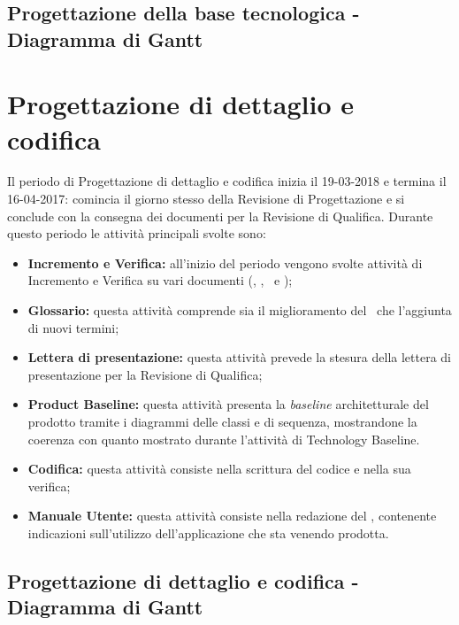 \documentclass[PianoDiProgetto.tex]{subfiles}
\begin{document}
\begin{landscape}
	\subsection{Progettazione della base tecnologica - Diagramma di Gantt}
\end{landscape}

\section{Progettazione di dettaglio e codifica}
Il periodo di Progettazione di dettaglio e codifica inizia il 19-03-2018 e termina il 16-04-2017: comincia il giorno stesso della Revisione di Progettazione e si conclude con la consegna dei documenti per la Revisione di Qualifica. Durante questo periodo le attività principali svolte sono:
\begin{itemize}
	\item \textbf{Incremento e Verifica:} all'inizio del periodo vengono svolte attività di Incremento e Verifica su vari documenti (\ndp, \pdp, \pdq\ e \tb);
	\item \textbf{Glossario:} questa attività comprende sia il miglioramento del \g\ che l'aggiunta di nuovi termini;
	\item \textbf{Lettera di presentazione:} questa attività prevede la stesura della lettera di presentazione per la Revisione di Qualifica;
	\item \textbf{Product Baseline:} questa attività presenta la \textit{baseline} architetturale del prodotto tramite i  diagrammi delle classi e di sequenza, mostrandone la coerenza con quanto mostrato durante l'attività di Technology Baseline. 
	\item \textbf{Codifica:} questa attività consiste nella scrittura del codice e nella sua verifica;
	\item \textbf{Manuale Utente:} questa attività consiste nella redazione del \mut, contenente indicazioni sull’utilizzo dell'applicazione che sta venendo prodotta.
\end{itemize}

\begin{landscape}
	\subsection{Progettazione di dettaglio e codifica - Diagramma di Gantt}

	
\end{landscape}
\end{document}
